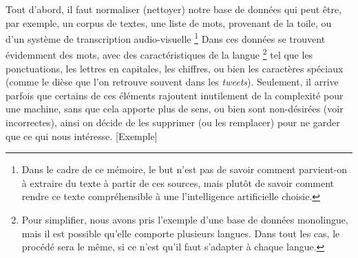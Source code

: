 \documentclass[12pt, french]{report}
\begin{document}
Tout d'abord, il faut normaliser (nettoyer) notre base de données qui peut être, par exemple, un corpus de textes, une liste de mots, provenant de la toile, ou d'un système de transcription audio-visuelle \footnote{Dans le cadre de ce mémoire, le but n'est pas de savoir comment parvient-on à extraire du texte à partir de ces sources, mais plutôt de savoir comment rendre ce texte compréhensible à une l'intelligence artificielle choisie.}
Dans ces données se trouvent évidemment des mots, avec des \og caractéristiques \fg de la  langue \footnote{Pour simplifier, nous avons pris l'exemple d'une base de données  monolingue, mais il est possible qu'elle comporte plusieurs langues. Dans tout les cas, le procédé sera le même, si ce n'est qu'il faut s'adapter à chaque langue.} tel que les ponctuations, les lettres en capitales, les chiffres, ou bien les caractères spéciaux (comme le dièse que l'on retrouve souvent dans les \textit{tweets}). Seulement, il arrive parfois que certains de ces éléments rajoutent inutilement de la complexité pour une machine, sans que cela apporte plus de sens, ou bien sont non-désirées (voir incorrectes), ainsi on décide de les supprimer (ou les remplacer) pour ne garder que ce qui nous intéresse. [Exemple]\\
\end{document}
